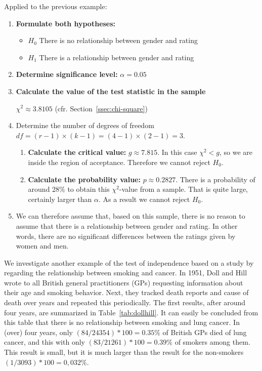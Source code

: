 Applied to the previous example:

\begin{enumerate}
  \item \textbf{Formulate both hypotheses:}
  \begin{itemize}
    \item $H_0$ There is no relationship between gender and rating
    \item $H_1$ There is a relationship between gender and rating
  \end{itemize}
  \item \textbf{Determine significance level:} $\alpha = 0.05$
  
  \item \textbf{Calculate the value of the test statistic in the sample}
  
  $\chi^2 \approx 3.8105$ (cfr. Section~\ref{ssec:chi-square})
  
  \item Determine the number of degrees of freedom $df = (r - 1) \times (k - 1) = (4 - 1) \times (2 - 1) = 3$.
  
  \begin{enumerate}
    \item \textbf{Calculate the critical value:} $g \approx 7.815$. In this case $\chi^2 < g$, so we are inside the region of acceptance. Therefore we cannot reject $H_0$.
    \item \textbf{Calculate the probability value:} $p \approx 0.2827$. There is a probability of around 28\% to obtain this $\chi^2$-value from a sample. That is quite large, certainly larger than $\alpha$. As a result we cannot reject $H_0$.
  \end{enumerate}

  \item We can therefore assume that, based on this sample, there is no reason to assume that there is a relationship between gender and rating. In other words, there are no significant differences between the ratings given by women and men.
\end{enumerate}


We investigate another example of the test of independence based on a study by \textcite{Doll1954} regarding the relationship between smoking and cancer. In 1951, Doll and Hill wrote to all British general practitioners (GPs) requesting information about their age and smoking behavior. Next, they tracked death reports and cause of death over years and repeated this periodically. The first results, after around four years, are summarized in Table~\ref{tab:dollhill}. It can easily be concluded from this table that there is no relationship between smoking and lung cancer. In (over) four years, only $(84 / 24354) * 100 = 0.35\%$ of British GPs died of lung cancer, and this with only $(83 / 21261) * 100 = 0.39\%$ of smokers among them. This result is small, but it is much larger than the result for the non-smokers $(1 / 3093) * 100 = 0,032\%$.

